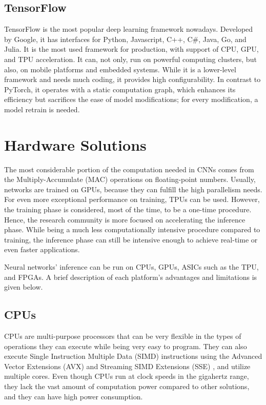 \subsection{TensorFlow}
TensorFlow \cite{TensorFlow-Large-Scale-Machine-Learning-on-Heterogeneous-Distributed-Systems} \cite{TensorFlow-Official-site} \cite{TensorFlow-Wikipedia} is the most popular deep learning framework nowadays. Developed by Google, it has interfaces for Python, Javascript, C++, C\#, Java, Go, and Julia. It is the most used framework for production, with support of CPU, GPU, and TPU acceleration. It can, not only, run on powerful computing clusters, but also, on mobile platforms and embedded systems. While it is a lower-level framework and needs much coding, it provides high configurability. In contrast to PyTorch, it operates with a static computation graph, which enhances its efficiency but sacrifices the ease of model modifications; for every modification, a model retrain is needed.

\section{Hardware Solutions}
The most considerable portion of the computation needed in CNNs comes from the Multiply-Accumulate (MAC) operations on floating-point numbers. Usually, networks are trained on GPUs, because they can fulfill the high parallelism needs. For even more exceptional performance on training, TPUs can be used. However, the training phase is considered, most of the time, to be a one-time procedure. Hence, the research community is more focused on accelerating the inference phase. While being a much less computationally intensive procedure compared to training, the inference phase can still be intensive enough to achieve real-time or even faster applications.

Neural networks' inference can be run on CPUs, GPUs, ASICs such as the TPU, and FPGAs. A brief description of each platform's advantages and limitations is given below.

\subsection{CPUs}
CPUs are multi-purpose processors that can be very flexible in the types of operations they can execute while being very easy to program. They can also execute Single Instruction Multiple Data (SIMD) instructions using the Advanced Vector Extensions (AVX) \cite{AVX-Wikipedia} and Streaming SIMD Extensions (SSE) \cite{SSE-Wikipedia}, and utilize multiple cores. Even though CPUs run at clock speeds in the gigahertz range, they lack the vast amount of computation power compared to other solutions, and they can have high power consumption.

